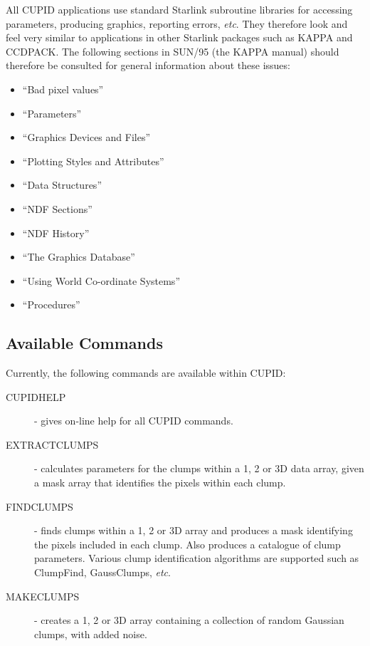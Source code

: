 \documentclass[twoside,11pt]{article}
\newcommand{\htmlref}[2]{#1}
\newcommand{\xref}[3]{#1}
\newcommand{\xlabel}[1]{}
\renewcommand{\_}{\texttt{\symbol{95}}}
\begin{document}
All CUPID applications use standard Starlink subroutine libraries for
accessing parameters, producing graphics, reporting errors, \emph{etc}. They
therefore look and feel very similar to applications in other Starlink
packages such as KAPPA and CCDPACK. The following sections in
\xref{SUN/95}{sun95}{} (the KAPPA manual) should therefore be consulted for 
general information about these issues:

\begin{itemize}
\item ``\xref{Bad pixel values}{sun95}{se_masking}''
\item ``\xref{Parameters}{sun95}{se_param}''
\item ``\xref{Graphics Devices and Files}{sun95}{se_graphdev}''
\item ``\xref{Plotting Styles and Attributes}{sun95}{se_style}''
\item ``\xref{Data Structures}{sun95}{se_datastr}''
\item ``\xref{NDF Sections}{sun95}{se_ndfsect}''
\item ``\xref{NDF History}{sun95}{se_ndfhistory}''
\item ``\xref{The Graphics Database}{sun95}{se_agitate}''
\item ``\xref{Using World Co-ordinate Systems}{sun95}{se_wcsuse}''
\item ``\xref{Procedures}{sun95}{se_procedures}''
\end{itemize}

\subsection{\xlabel{availablecommands}Available Commands}
Currently, the following commands are available within CUPID:
\begin{description}

\item[\htmlref{CUPIDHELP}{CUPIDHELP}] - gives on-line help for all CUPID
commands.

\item[\htmlref{EXTRACTCLUMPS}{EXTRACTCLUMPS}] - calculates parameters for
the clumps within a 1, 2 or 3D data array, given a mask array that identifies 
the pixels within each clump.
 
\item[\htmlref{FINDCLUMPS}{FINDCLUMPS}] - finds clumps within a 1, 2 or 3D 
array and produces a mask identifying the pixels included in each clump.
Also produces a catalogue of clump parameters. Various clump
identification algorithms are supported such as ClumpFind, GaussClumps,
\emph{etc}.

\item[\htmlref{MAKECLUMPS}{MAKECLUMPS}] - creates a 1, 2 or 3D array
containing a collection of random Gaussian clumps, with added noise.

\end{description}
\end{document}
